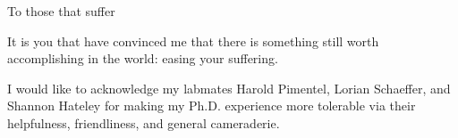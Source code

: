 \documentclass{ucbthesis}
\begin{document}


\maketitle
\copyrightpage



\begin{frontmatter}

\begin{dedication}
\null\vfil
\begin{center}
To those that suffer\\\vspace{12pt}

It is you that have convinced me that there is something still worth
accomplishing in the world: easing your suffering.

\end{center}
\vfil\null
\end{dedication}


\tableofcontents
\clearpage
\listoffigures
\clearpage
\listoftables

\begin{acknowledgements}
I would like to acknowledge my labmates Harold Pimentel, Lorian Schaeffer, and Shannon Hateley for making my Ph.D. experience more tolerable via their helpfulness, friendliness, and general cameraderie. 
\end{acknowledgements}

\end{frontmatter}

\pagestyle{headings}












\printbibliography
\end{document}
